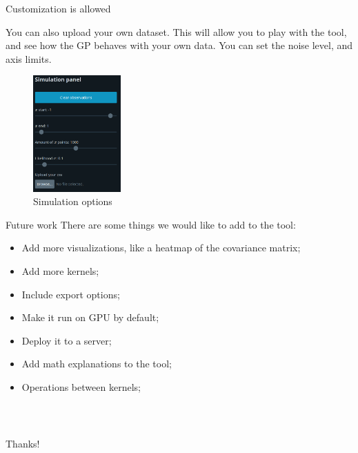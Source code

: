 \documentclass[xcolor=dvipsnames,t,aspectratio=169]{beamer} %
\newcommand{\highlight}[1]{{\color{fgv_light_blue} #1}}
\begin{document}
\begin{frame}[c]{Customization \highlight{is} allowed}
    \begin{multicols}{2}
    You can also \highlight{upload} your own dataset. This will allow you to \highlight{play} with the tool, and see how the GP behaves with your own data. You can set the \highlight{noise} level, and axis \highlight{limits}.

    \begin{figure}[H]
        \centering
        \includegraphics[width=0.30\textwidth]{imgs/simulation.png}
        \caption{Simulation options}
    \end{figure}
    \end{multicols}
\end{frame}

\begin{frame}[c]{Future \highlight{work}}
    There are some things we would like to add to the tool:

    \begin{itemize}
        \item Add \highlight{more} visualizations, like a heatmap of the covariance matrix;
        \item Add more \highlight{kernels};
        \item Include \highlight{export} options;
        \item Make it run on \highlight{GPU} by default;
        \item Deploy it to a \highlight{server};
        \item Add math \highlight{explanations} to the tool;
        \item Operations between \highlight{kernels};
    \end{itemize}
    
\end{frame}

\begin{frame}[c]
\frametitle{~}
    
    \begin{center}
        {\Huge Thanks!}
    \end{center}
    
\end{frame}
\end{document}
